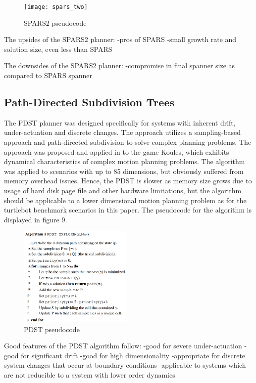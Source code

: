 \documentclass[conference]{IEEEtran} \usepackage[T1]{fontenc} \usepackage[backend=biber, style=ieee]{biblatex}
\begin{document}
\begin{figure}
\label{figure8} 
\centering 
\texttt{[image: spars\_two]}
\caption{SPARS2 pseudocode}
\end{figure}

The upsides of the SPARS2 planner:
-pros of SPARS
-small growth rate and solution size, even less than SPARS

The downsides of the SPARS2 planner:
-compromise in final spanner size as compared to SPARS spanner

\subsection{Path-Directed Subdivision Trees} \label{PDST}
The PDST planner was designed specifically for systems with inherent drift, under-actuation and discrete changes. The approach utilizes a sampling-based
approach and path-directed subdivision to solve complex planning problems. The approach was proposed and applied in \cite{pdst} to the game Koules, which exhibits 
dynamical characteristics of complex motion planning problems. The algorithm was applied to scenarios with up to 85 dimensions, but obviously suffered from
memory overhead issues. Hence, the PDST is slower as memory size grows due to usage of hard disk page file and other hardware limitations, but the algorithm
should be applicable to a lower dimensional motion planning problem as for the turtlebot benchmark scenarios in this paper. The pseudocode for the algorithm is displayed in figure 9.

\begin{figure}
\label{figure9} 
\centering 
\includegraphics[width=0.49\textwidth]{pdst}
\caption{PDST pseudocode}
\end{figure}

Good features of the PDST algorithm follow:
-good for severe under-actuation
-good for significant drift
-good for high dimensionality
-appropriate for discrete system changes that occur at boundary conditions
-applicable to systems which are not reducible to a system with lower order dynamics
\end{document}
